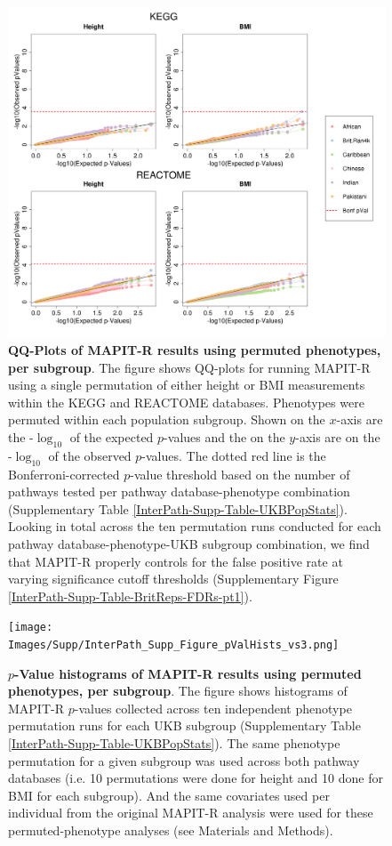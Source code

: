 \begin{figure}[htbp]
\centering
\includegraphics[scale=.35]{Images/Supp/InterPath_Supp_Figure_perm1_QQPlots_AllPaths_vs2.png}
\caption[TBD]{\textbf{QQ-Plots of MAPIT-R results using permuted phenotypes, per subgroup}. The figure shows QQ-plots for running MAPIT-R using a single permutation of either height or BMI measurements within the KEGG and REACTOME databases. Phenotypes were permuted within each population subgroup. Shown on the $x$-axis are the -$\log_{10}$ of the expected $p$-values and the on the $y$-axis are on the -$\log_{10}$ of the observed $p$-values. The dotted red line is the Bonferroni-corrected $p$-value threshold based on the number of pathways tested per pathway database-phenotype combination (Supplementary Table \ref{InterPath-Supp-Table-UKBPopStats}). Looking in total across the ten permutation runs conducted for each pathway database-phenotype-UKB subgroup combination, we find that MAPIT-R properly controls for the false positive rate at varying significance cutoff thresholds (Supplementary Figure \ref{InterPath-Supp-Table-BritReps-FDRs-pt1}).}
\label{InterPath-Supp-Figure-perm1-QQPlots-AllPaths}
\end{figure}
\clearpage

\setlength{\footskip}{3cm}
\begin{figure}[htbp]
\centering
\vspace*{-2cm}
\texttt{[image: Images/Supp/InterPath\_Supp\_Figure\_pValHists\_vs3.png]}
\caption[TBD]{\textbf{$p$-Value histograms of MAPIT-R results using permuted phenotypes, per subgroup}. The figure shows histograms of MAPIT-R $p$-values collected across ten independent phenotype permutation runs for each UKB subgroup (Supplementary Table \ref{InterPath-Supp-Table-UKBPopStats}). The same phenotype permutation for a given subgroup was used across both pathway databases (i.e. 10 permutations were done for height and 10 done for BMI for each subgroup). And the same covariates used per individual from the original MAPIT-R analysis were used for these permuted-phenotype analyses (see Materials and Methods).}
\label{InterPath-Supp-Figure-10perms-pValHists}
\end{figure}
\clearpage
\setlength{\footskip}{1cm}

